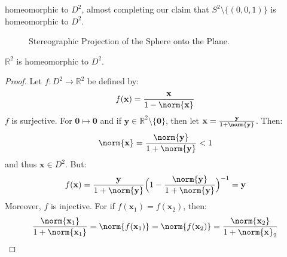 \documentclass[crop=false,class=book,oneside]{standalone}                      %
\begin{document}
            homeomorphic to $D^{2}$, almost completing our claim
            that $S^{2}\setminus\{(0,0,1)\}$
            is homeomorphic to $D^{2}$.
            \begin{figure}[H]
                \captionsetup{type=figure}
                \centering
                \caption{Stereographic Projection of the Sphere onto the Plane.}
                \label{fig:surgery_theory_stereographic_%
                       projection_of_sphere_to_plane_homeomorphism}
            \end{figure}
            \begin{theorem}
                $\mathbb{R}^{2}$ is homeomorphic to $D^{2}$.
            \end{theorem}
            \begin{proof}
                Let $f:D^{2}\rightarrow\mathbb{R}^{2}$
                be defined by:
                \begin{equation}
                    f(\mathbf{x})=\frac{\mathbf{x}}{1-\norm{\mathbf{x}}}
                \end{equation}
                $f$ is surjective.
                For $\mathbf{0}\mapsto\mathbf{0}$ and if
                $\mathbf{y}\in\mathbb{R}^2\setminus\{\mathbf{0}\}$, then let
                $\mathbf{x}=\frac{\mathbf{y}}{1+\norm{\mathbf{y}}}$.
                Then:
                \begin{equation}
                    \norm{\mathbf{x}}
                    =\frac{\norm{\mathbf{y}}}{1+\norm{\mathbf{y}}}<1
                \end{equation}
                and thus $\mathbf{x}\in D^{2}$. But:
                \begin{equation}
                    f(\mathbf{x})
                    =\frac{\mathbf{y}}{1+\norm{\mathbf{y}}}
                    \Big(
                        1-\frac{\norm{\mathbf{y}}}{1+\norm{\mathbf{y}}}
                    \Big)^{-1}
                    =\mathbf{y}
                \end{equation}
                Moreover, $f$ is injective.
                For if
                $f(\mathbf{x}_{1})=f(\mathbf{x}_{2})$,
                then:
                \begin{equation}
                    \frac{\norm{\mathbf{x}_{1}}}{1+\norm{\mathbf{x}_{1}}}
                    =\norm{f(\mathbf{x}_{1})}
                    =\norm{f(\mathbf{x}_{2})}
                    =\frac{\norm{\mathbf{x}_{2}}}{1+\norm{\mathbf{x}}_{2}}

\end{equation}
\end{proof}
\end{document}
